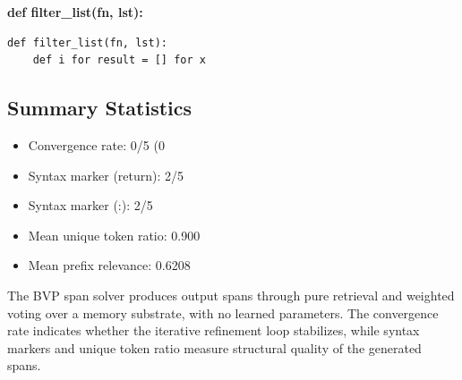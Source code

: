\noindent\textbf{def filter\_list(fn, lst):}

\begin{verbatim}
def filter_list(fn, lst):
    def i for result = [] for x
\end{verbatim}

\subsection{Summary Statistics}
\begin{itemize}
    \item Convergence rate: 0/5 (0%
    \item Syntax marker (return): 2/5
    \item Syntax marker (:): 2/5
    \item Mean unique token ratio: 0.900
    \item Mean prefix relevance: 0.6208
\end{itemize}

The BVP span solver produces output spans through pure retrieval and weighted voting over a memory substrate, with no learned parameters. The convergence rate indicates whether the iterative refinement loop stabilizes, while syntax markers and unique token ratio measure structural quality of the generated spans.
